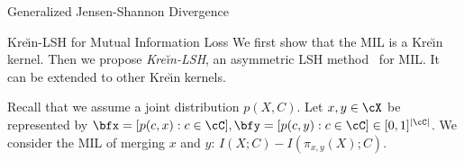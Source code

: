 \documentclass[final]{beamer}
\newcommand{\kr}{Kre\u{\i}n\xspace}
\DeclareMathOperator{\hel}{hel}
\newlength{\threecolwid}
\begin{document}
\begin{frame}[t]
\begin{columns}[t]
\begin{column}{\threecolwid}
\begin{block}{Generalized Jensen-Shannon 
			Divergence}
%		
		
	\end{block}
	

	
	\begin{block}{\kr-LSH for Mutual Information Loss}
 		We first show that the MIL is a 
 		\kr 
 		kernel. 
 		Then
 		we propose \emph{\kr-LSH}, an asymmetric LSH 
 		method~\cite{shrivastava2014asymmetric} for MIL. 
 		It can be extended to other \kr kernels.
 		
 		
 		Recall that we assume a joint distribution $ 
 		p(X,C) $.
 		Let $ x,y\in \cX $ be represented 
 		by 
 		$\bfx=[p(c,x):c\in \cC], \bfy=[p(c,y):c\in 
 		\cC]\in 
 		[0,1]^{|\cC|}$.
 		We consider the MIL of merging $ x  $ and $ y $:
 		$ I(X;C)-I(\pi_{x,y}(X);C)$. 
 		

\end{block}
\end{column}
\end{columns}
\end{frame}
\end{document}
